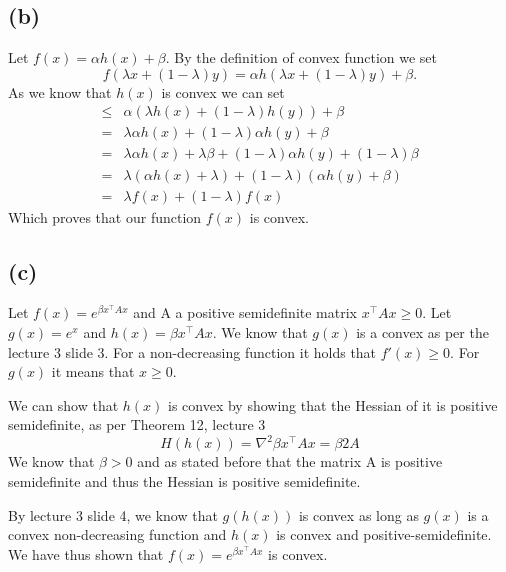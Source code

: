 \documentclass{article}
\begin{document}
	\subsection*{(b)}
	Let $f(x)=\alpha h(x) + \beta$.
	By the definition of convex function we set
	\begin{equation}
		f(\lambda x + (1-\lambda) y ) =
		\alpha h(\lambda x + (1-\lambda) y ) + \beta.
	\end{equation}
	As we know that $h(x)$ is convex we can set
	\begin{align}
		\leq& \alpha (\lambda h(x) + (1-\lambda) h(y) ) + \beta \\
		= &\lambda \alpha h(x) + (1-\lambda)\alpha h(y) + \beta \\
		= & \lambda \alpha h(x) + \lambda\beta + (1-\lambda)\alpha h(y) + (1-\lambda)\beta \\
		=& \lambda (\alpha h(x) + \lambda) + (1-\lambda)(\alpha h(y) + \beta) \\
		=& \lambda f(x) + (1-\lambda)f(x)
	\end{align}
	Which proves that our function $f(x)$ is convex.
	\subsection*{(c)}
	Let $f(x) = e^{\beta x^\top A x}$ and A a positive semidefinite matrix $x^\top A x \geq 0$. Let $g(x)=e^x$ and $h(x)=\beta x^\top A x$. We know that $g(x)$ is a convex as per the lecture 3 slide 3. For a non-decreasing function it holds that $f'(x)\geq 0$. For $g(x)$ it means that $x\geq 0$.
	
	We can show that $h(x)$ is convex by showing that the Hessian of it is positive semidefinite, as per Theorem 12, lecture 3
	\begin{equation}
		H(h(x)) = \nabla^2 \beta x^\top A x = \beta 2 A
	\end{equation}
	We know that $\beta > 0$ and as stated before that the matrix A is positive semidefinite and thus the Hessian is positive semidefinite.
	
	By lecture 3 slide 4, we know that $g(h(x))$ is convex as long as $g(x)$ is a convex non-decreasing function and $h(x)$ is convex and positive-semidefinite. We have thus shown that $f(x) = e^{\beta x^\top A x}$ is convex.
\end{document}

